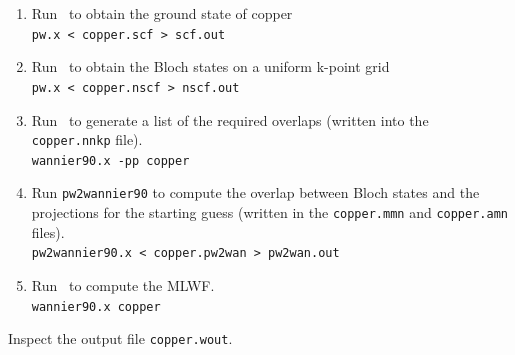 \documentclass[a4paper,11pt,twoside]{article}
\begin{document}
\begin{enumerate}
\item Run \pwscf\ to obtain the ground state of copper\\
{\tt pw.x < copper.scf > scf.out}

\item Run \pwscf\ to obtain the Bloch states on a uniform k-point grid\\
{\tt pw.x < copper.nscf > nscf.out}

\item Run \wannier\ to generate a list of the required overlaps (written
  into the {\tt copper.nnkp} file).\\ 
{\tt wannier90.x -pp copper}

\item Run {\tt pw2wannier90} to compute the overlap between Bloch
  states and the projections for the starting guess (written in the
  {\tt copper.mmn} and {\tt copper.amn} files).\\  
{\tt pw2wannier90.x < copper.pw2wan > pw2wan.out}

\item Run \wannier\ to compute the MLWF.\\
{\tt wannier90.x copper}
\end{enumerate}

Inspect the output file {\tt copper.wout}. 
\end{document}
